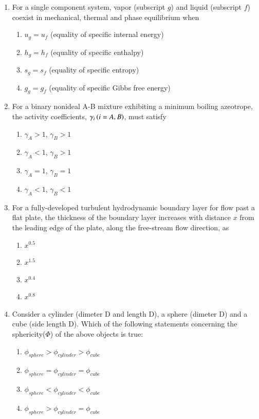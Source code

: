 \documentclass[journal,12pt,onecolumn]{IEEEtran}
\theoremstyle{remark}
\begin{document}
\begin{enumerate}
    

    \item For a single component system, vapor (subscript $g$) and liquid (subscript $f$) coexist in mechanical, thermal and phase equilibrium when 

\begin{enumerate}
    \item $u_g = u_f$ (equality of specific internal energy)
    \item $h_g = h_f$ (equality of specific enthalpy)
    \item $s_g = s_f$ (equality of specific entropy)
    \item $g_g = g_f$ (equality of specific Gibbs free energy)
\end{enumerate}

    \item  For a binary nonideal A-B mixture exhibiting a minimum boiling azeotrope, the activity coefficients, $\gamma_i\left(i = A,B\right)$, must satisfy

\begin{enumerate}
    \item $\gamma_A > 1$, $\gamma_B > 1$
    \item $\gamma_A < 1$, $\gamma_B > 1$
    \item $\gamma_A = 1$, $\gamma_B = 1$
    \item $\gamma_A < 1$, $\gamma_B < 1$
\end{enumerate}

    \item For a fully-developed turbulent hydrodynamic boundary layer for flow past a flat plate, the thickness of the boundary layer increases with distance $x$ from the leading edge of the plate, along the free-stream flow direction, as
\begin{multicols}{4}
    \begin{enumerate}
        \item $x^{0.5}$
        \item $x^{1.5}$
        \item $x^{0.4}$
        \item $x^{0.8}$
    \end{enumerate}
\end{multicols}

    \item Consider a cylinder (dimeter D and length D), a sphere (dimeter D) and a cube (side length D). Which of the following statements concerning the sphericity($\Phi$) of the above objects is true:
\begin{multicols}{2}
    \begin{enumerate}
        \item $\phi_{sphere} > \phi_{cylinder} > \phi_{cube}$
        \item $\phi_{sphere} = \phi_{cylinder} = \phi_{cube}$
        \item $\phi_{sphere} < \phi_{cylinder} < \phi_{cube}$
        \item $\phi_{sphere} > \phi_{cylinder} = \phi_{cube} $
    \end{enumerate}
\end{multicols}


\end{enumerate}
\end{document}
